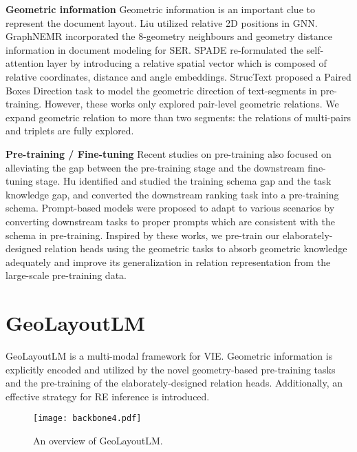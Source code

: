\documentclass[10pt,twocolumn,letterpaper]{article}
\begin{document}
\noindent\textbf{Geometric information} 
Geometric information is an important clue to represent the document layout.
Liu \etal\cite{liu2019graph} utilized relative 2D positions in GNN.
GraphNEMR\cite{luo2020merge} incorporated the 8-geometry neighbours and geometry distance information in document modeling for SER.
SPADE\cite{hwang2020spatial} re-formulated the self-attention layer by introducing a relative spatial vector which is composed of relative coordinates, distance and angle embeddings. 
StrucText\cite{li2021structext} proposed a Paired Boxes Direction task to model the geometric direction of text-segments in pre-training.
However, these works only explored pair-level geometric relations. We expand geometric relation to more than two segments: the relations of multi-pairs and triplets are fully explored.

\noindent\textbf{Pre-training / Fine-tuning}
Recent studies on pre-training also focused on alleviating the gap between the pre-training stage and the downstream fine-tuning stage\cite{chronopoulou2019embarrassingly,howard2018universal,gururangan2020don,han2021adaptive,hu2022p,liu2022prompt}.
Hu \etal\cite{hu2022p} identified and studied the training schema gap and the task knowledge gap, and converted the downstream ranking task into a pre-training schema.
Prompt-based models were proposed to adapt to various scenarios by converting downstream tasks to proper prompts which are consistent with the schema in pre-training\cite{liu2022prompt}.
Inspired by these works, we pre-train our elaborately-designed relation heads using the geometric tasks to absorb geometric knowledge adequately and improve its generalization in relation representation from the large-scale pre-training data.

\section{GeoLayoutLM}
GeoLayoutLM is a multi-modal framework for VIE. Geometric information is explicitly encoded and utilized by the novel geometry-based pre-training tasks and the pre-training of the elaborately-designed relation heads.
Additionally, an effective strategy for RE inference is introduced.



\begin{figure}[tp]
  \centering
\texttt{[image: backbone4.pdf]}
  \caption{An overview of GeoLayoutLM.}
  \label{model_arch}
  \vspace{-0.20in}
\end{figure}
\end{document}
